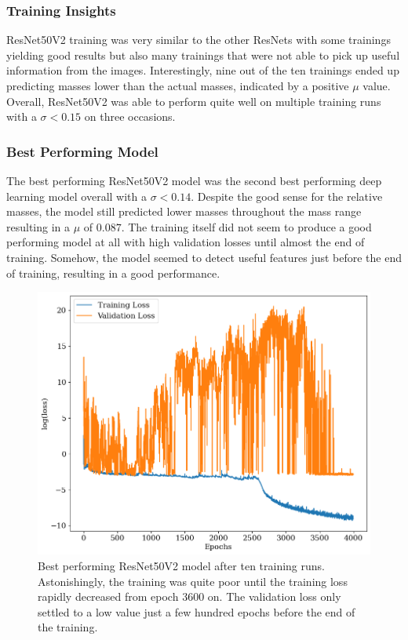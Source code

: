 \subsubsection*{Training Insights}
ResNet50V2 training was very similar to the other ResNets with some trainings yielding good results but also many trainings that were not able to pick up useful information from the images. Interestingly, nine out of the ten trainings ended up predicting masses lower than the actual masses, indicated by a positive $\mu$ value. Overall, ResNet50V2 was able to perform quite well on multiple training runs with a $\sigma < 0.15$ on three occasions.

\subsubsection*{Best Performing Model}
The best performing ResNet50V2 model was the second best performing deep learning model overall with a $\sigma < 0.14$. Despite the good sense for the relative masses, the model still predicted lower masses throughout the mass range resulting in a $\mu$ of $0.087$. The training itself did not seem to produce a good performing model at all with high validation losses until almost the end of training. Somehow, the model seemed to detect useful features just before the end of training, resulting in a good performance.

\begin{figure}[H]
\centering
\includegraphics[width=.667\textwidth]{images/Chapter4/Res50V2/resnet50V2_history.png}
\caption{Best performing ResNet50V2 model after ten training runs. Astonishingly, the training was quite poor until the training loss rapidly decreased from epoch 3600 on. The validation loss only settled to a low value just a few hundred epochs before the end of the training. } 
\label{fig:resnet50v2_best_history}
\end{figure}


